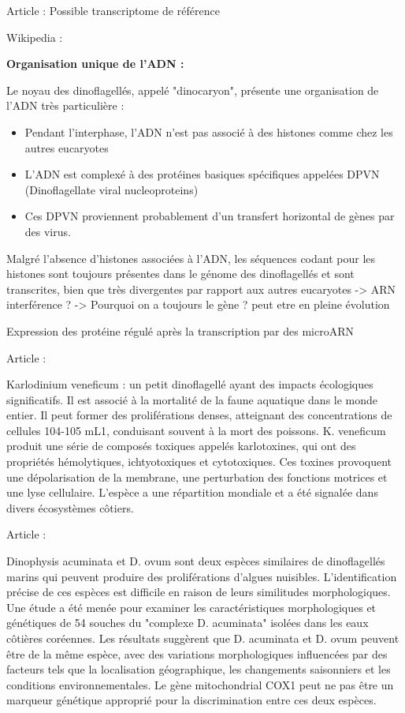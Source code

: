 \documentclass{article}
\begin{document}
Article \cite{gaonkar2023novo }:
Possible transcriptome de référence 

Wikipedia : 

\textbf{Organisation unique de l'ADN :}

Le noyau des dinoflagellés, appelé "dinocaryon", présente une organisation de l'ADN très particulière :
\begin{itemize}
    \item Pendant l'interphase, l'ADN n'est pas associé à des histones comme chez les autres eucaryotes
    \item L'ADN est complexé à des protéines basiques spécifiques appelées DPVN (Dinoflagellate viral nucleoproteins)
    \item Ces DPVN proviennent probablement d'un transfert horizontal de gènes par des virus.
\end{itemize}

Malgré l'absence d'histones associées à l'ADN, les séquences codant pour les histones sont toujours présentes dans le génome des dinoflagellés et sont transcrites, bien que très divergentes par rapport aux autres eucaryotes
-> ARN interférence ?
-> Pourquoi on a toujours le gène ? peut etre en pleine évolution 

Expression des protéine régulé après la transcription par des microARN 

Article : \cite{place2012karlodinium}

Karlodinium veneficum : un petit dinoflagellé ayant des impacts écologiques significatifs. Il est associé à la mortalité de la faune aquatique dans le monde entier.
Il peut former des proliférations denses, atteignant des concentrations de cellules 104-105 mL1, conduisant souvent à la mort des poissons.
K. veneficum produit une série de composés toxiques appelés karlotoxines, qui ont des propriétés hémolytiques, ichtyotoxiques et cytotoxiques.
Ces toxines provoquent une dépolarisation de la membrane, une perturbation des fonctions motrices et une lyse cellulaire.
L'espèce a une répartition mondiale et a été signalée dans divers écosystèmes côtiers.

Article : \cite{park2019revisiting}

Dinophysis acuminata et D. ovum sont deux espèces similaires de dinoflagellés marins qui peuvent produire des proliférations d'algues nuisibles.
L'identification précise de ces espèces est difficile en raison de leurs similitudes morphologiques.
Une étude a été menée pour examiner les caractéristiques morphologiques et génétiques de 54 souches du "complexe D. acuminata" isolées dans les eaux côtières coréennes.
Les résultats suggèrent que D. acuminata et D. ovum peuvent être de la même espèce, avec des variations morphologiques influencées par des facteurs tels que la localisation géographique, les changements saisonniers et les conditions environnementales.
Le gène mitochondrial COX1 peut ne pas être un marqueur génétique approprié pour la discrimination entre ces deux espèces.
\end{document}
